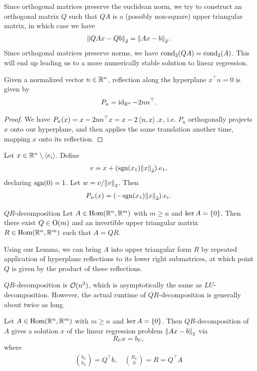 Since orthogonal matrices preserve the euclidean norm, we try to construct an orthogonal matrix $Q$ such that $QA$ is a (possibly non-square) upper triangular matrix, in which case we have
\begin{align*}
	\norm{QAx - Qb}_2 = \norm{Ax - b}_2.
\end{align*}
Since orthogonal matrices preserve norms, we have $\operatorname{cond}_2(QA) = \operatorname{cond}_2(A)$. This will end up leading us to a more numerically stable solution to linear regression.
\begin{importanttheorem}{}{}
	Given a normalized vector $n \in \mathbb{R}^n$, reflection along the hyperplane $x^\top n = 0$ is given by
	\begin{align*}
		P_n = \operatorname{id}_{\mathbb{R}^n} - 2nn^\top.
	\end{align*}
\end{importanttheorem}
\begin{proof}
	We have $P_n(x) = x - 2nn^\top x = x - 2\left\langle n, x \right\rangle.x$, i.e. $P_n$ orthogonally projects $x$ onto our hyperplane, and then applies the same translation another time, mapping $x$ onto its reflection.
\end{proof}
\begin{lemma}
	Let $x \in \mathbb{R}^n \setminus \left\langle e_i \right\rangle$. Define
	\begin{align*}
		v = x + (\operatorname{sgn}(x_1)\norm{x}_2).e_1,
	\end{align*}
	declaring $\operatorname{sgn}(0) = 1$. Let $w = v/\norm{v}_2$. Then 
	\begin{align*}
		P_w(x) = (-\operatorname{sgn}(x_1)\norm{x}_2).e_i.
	\end{align*}
\end{lemma}
\begin{importanttheorem}{$QR$-decomposition}{}
	Let $A \in \textnormal{Hom}(\mathbb{R}^n, \mathbb{R}^m)$ with $m \geq n$ and $\ker A = \qty{0}$. Then there exist $Q \in \textnormal{O}(m)$ and an invertible upper triangular matrix $R \in \textnormal{Hom}(\mathbb{R}^n, \mathbb{R}^m)$ such that $A = QR$.
\end{importanttheorem}
\begin{proofsketch}
	Using our Lemma, we can bring $A$ into upper triangular form $R$ by repeated application of hyperplane reflections to its lower right submatrices, at which point $Q$ is given by the product of these reflections.
\end{proofsketch}
\noindent
$QR$-decomposition is $\mathcal{O}(n^3)$, which is asymptotically the same as $LU$-decomposition. However, the actual runtime of $QR$-decomposition is generally about twice as long.
\begin{importanttheorem}{}{}
	Let $A \in \textnormal{Hom}(\mathbb{R}^n, \mathbb{R}^m)$ with $m \geq n$ and $\ker A = \qty{0}$. Then $QR$-decomposition of $A$ gives a solution $x$ of the linear regression problem $\norm{Ax -b}_2$ via $$R_U x = b_U,$$ where
	\begin{align*}
		\binom{b_U}{b_L} = Q^\top b, \quad \binom{R_U}{0} = R = Q^\top A
	\end{align*}
\end{importanttheorem}

